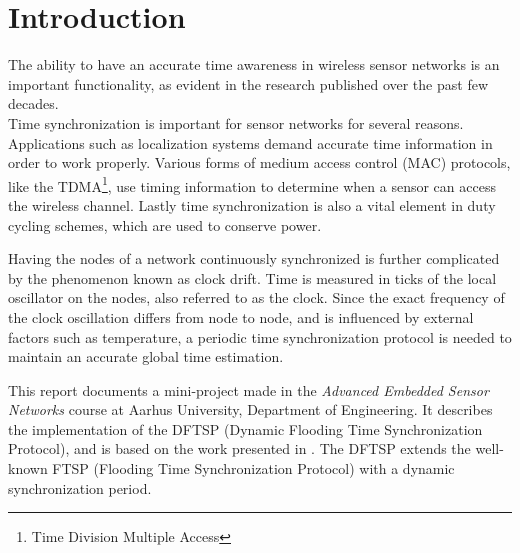 \documentclass[Main]{subfiles}
\begin{document}
\section{Introduction} %
\label{sec:introduction}

	The ability to have an accurate time awareness in wireless sensor networks is an important functionality, as evident in the research published over the past few decades\cite{FTSParticle,dynamicFTSParticle,RBSarticle,TPSNarticle}.
	\\Time synchronization is important for sensor networks for several reasons.
	Applications such as localization systems demand accurate time information in order to work properly.
	Various forms of medium access control (MAC) protocols, like the TDMA\footnote{Time Division Multiple Access}, use timing information to determine when a sensor can access the wireless channel.
	Lastly time synchronization is also a vital element in duty cycling schemes, which are used to conserve power.

	Having the nodes of a network continuously synchronized is further complicated by the phenomenon known as clock drift. 
	Time is measured in ticks of the local oscillator on the nodes, also referred to as the clock.
	Since the exact frequency of the clock oscillation differs from node to node, and is influenced by external factors such as temperature, a periodic time synchronization protocol is needed to maintain an accurate global time estimation.

	This report documents a mini-project made in the \emph{Advanced Embedded Sensor Networks} course at Aarhus University, Department of Engineering. 
	It describes the implementation of the DFTSP (Dynamic Flooding Time Synchronization Protocol), and is based on the work presented in \cite{dynamicFTSParticle}. 
	The DFTSP extends the well-known FTSP (Flooding Time Synchronization Protocol)\cite{FTSParticle} with a dynamic synchronization period. 

\end{document}
